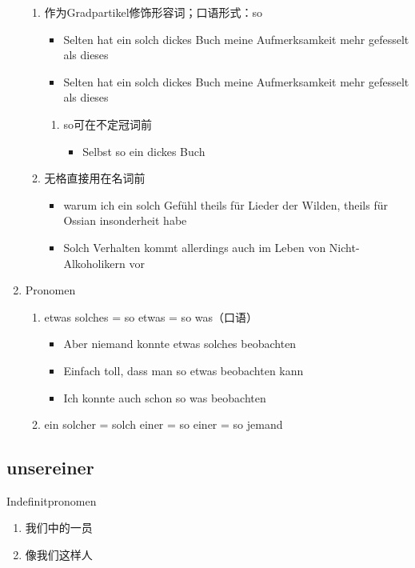 \documentclass[UTF8]{report}
\begin{document}
\begin{enumerate}
\begin{enumerate}
        \item 作为Gradpartikel修饰形容词；口语形式：so
        \begin{itemize}
            \item Selten hat ein solch dickes Buch meine Aufmerksamkeit mehr gefesselt als dieses
            \item Selten hat ein solch dickes Buch meine Aufmerksamkeit mehr gefesselt als dieses
        \end{itemize}
        \begin{enumerate}
            \item so可在不定冠词前
            \begin{itemize}
                \item Selbst so ein dickes Buch
            \end{itemize}
        \end{enumerate}
        \item 无格直接用在名词前
        \begin{itemize}
            \item warum ich ein solch Gefühl theils für Lieder der Wilden, theils für Ossian insonderheit habe
            \item Solch Verhalten kommt allerdings auch im Leben von Nicht-Alkoholikern vor
        \end{itemize}
    \end{enumerate}
    \item Pronomen
    \begin{enumerate}
        \item etwas solches = so etwas = so was（口语）
        \begin{itemize}
            \item Aber niemand konnte etwas solches beobachten
            \item Einfach toll, dass man so etwas beobachten kann
            \item Ich konnte auch schon so was beobachten
        \end{itemize}
        \item ein solcher = solch einer = so einer = so jemand 
    \end{enumerate}
\end{enumerate}

\subsection{unsereiner}
Indefinitpronomen
\begin{enumerate}
    \item 我们中的一员
    \item 像我们这样人
\end{enumerate}
\end{document}
